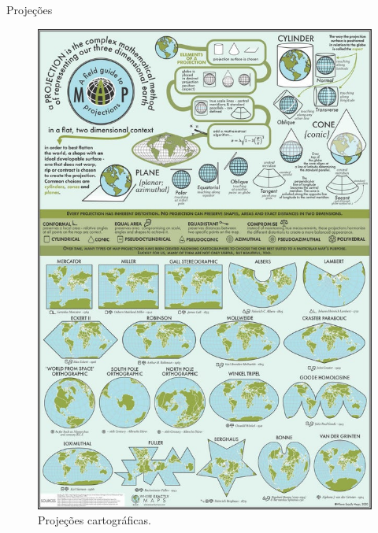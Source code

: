 \documentclass[9pt,ignorenonframetext,]{beamer}
\begin{document}
\begin{frame}[plain]{Projeções}
\protect\hypertarget{projeuxe7uxf5es-1}{}

\begin{figure}[H]

{\centering \includegraphics[width=1\linewidth]{images/projecoes} 

}

\caption{Projeções cartográficas.}\label{fig:unnamed-chunk-10}
\end{figure}

\end{frame}
\end{document}
